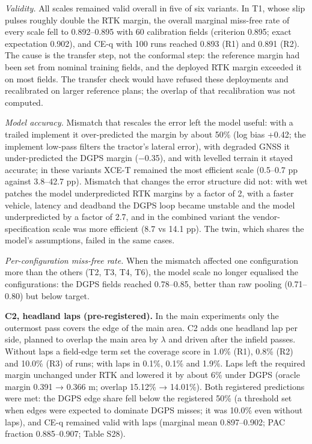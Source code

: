 \documentclass[preprint,12pt,authoryear]{elsarticle}
\begin{document}
\emph{Validity.} All scales remained valid overall in five of six variants. In T1, whose slip pulses roughly double the RTK margin, the overall marginal miss-free rate of every scale fell to 0.892--0.895 with 60 calibration fields (criterion 0.895; exact expectation 0.902), and CE-q with 100 runs reached 0.893 (R1) and 0.891 (R2). The cause is the transfer step, not the conformal step: the reference margin had been set from nominal training fields, and the deployed RTK margin exceeded it on most fields. The transfer check would have refused these deployments and recalibrated on larger reference plans; the overlap of that recalibration was not computed.

\emph{Model accuracy.} Mismatch that rescales the error left the model useful: with a trailed implement it over-predicted the margin by about 50\% (log bias +0.42; the implement low-pass filters the tractor's lateral error), with degraded GNSS it under-predicted the DGPS margin (−0.35), and with levelled terrain it stayed accurate; in these variants XCE-T remained the most efficient scale (0.5--0.7 pp against 3.8--42.7 pp). Mismatch that changes the error structure did not: with wet patches the model underpredicted RTK margins by a factor of 2, with a faster vehicle, latency and deadband the DGPS loop became unstable and the model underpredicted by a factor of 2.7, and in the combined variant the vendor-specification scale was more efficient (8.7 vs 14.1 pp). The twin, which shares the model's assumptions, failed in the same cases.

\emph{Per-configuration miss-free rate.} When the mismatch affected one configuration more than the others (T2, T3, T4, T6), the model scale no longer equalised the configurations: the DGPS fields reached 0.78--0.85, better than raw pooling (0.71--0.80) but below target.

\textbf{C2, headland laps (pre-registered).} In the main experiments only the outermost pass covers the edge of the main area. C2 adds one headland lap per side, planned to overlap the main area by \(\lambda\) and driven after the infield passes. Without laps a field-edge term set the coverage score in 1.0\% (R1), 0.8\% (R2) and 10.0\% (R3) of runs; with laps in 0.1\%, 0.1\% and 1.9\%. Laps left the required margin unchanged under RTK and lowered it by about 6\% under DGPS (oracle margin 0.391 → 0.366 m; overlap 15.12\% → 14.01\%). Both registered predictions were met: the DGPS edge share fell below the registered 50\% (a threshold set when edges were expected to dominate DGPS misses; it was 10.0\% even without laps), and CE-q remained valid with laps (marginal mean 0.897--0.902; PAC fraction 0.885--0.907; Table S28).
\end{document}
